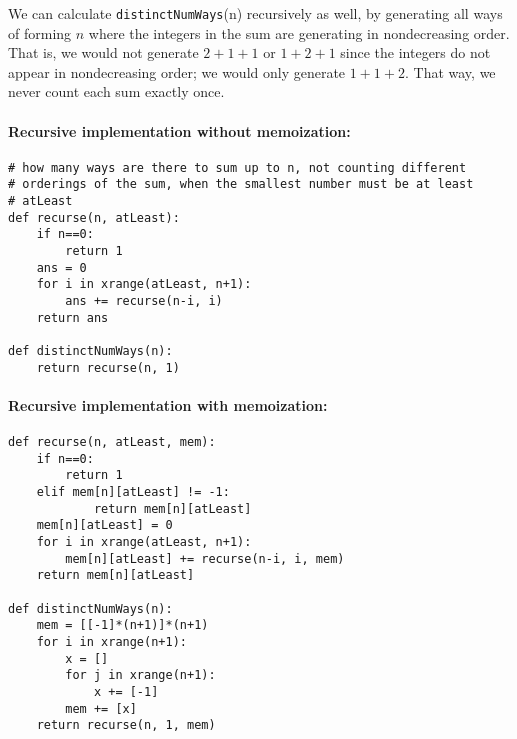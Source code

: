 \documentclass[11pt]{article}
\begin{document}
We can calculate \texttt{distinctNumWays}(n) recursively as well, by
generating all ways of forming $n$ where the integers in the sum are
generating in nondecreasing order.  That is, we would not generate
$2+1+1$ or $1+2+1$ since the integers do not appear in nondecreasing
order; we would only generate $1+1+2$.  That way, we never count each
sum exactly once.

\paragraph{Recursive implementation without memoization:}
\begin{verbatim}
# how many ways are there to sum up to n, not counting different
# orderings of the sum, when the smallest number must be at least
# atLeast
def recurse(n, atLeast):
    if n==0:
        return 1
    ans = 0
    for i in xrange(atLeast, n+1):
        ans += recurse(n-i, i)
    return ans

def distinctNumWays(n):
    return recurse(n, 1)
\end{verbatim}

\paragraph{Recursive implementation with memoization:}
\begin{verbatim}
def recurse(n, atLeast, mem):
    if n==0:
        return 1
    elif mem[n][atLeast] != -1:
            return mem[n][atLeast]
    mem[n][atLeast] = 0
    for i in xrange(atLeast, n+1):
        mem[n][atLeast] += recurse(n-i, i, mem)
    return mem[n][atLeast]

def distinctNumWays(n):
    mem = [[-1]*(n+1)]*(n+1)
    for i in xrange(n+1):
        x = []
        for j in xrange(n+1):
            x += [-1]
        mem += [x]
    return recurse(n, 1, mem)
\end{verbatim}
\end{document}
